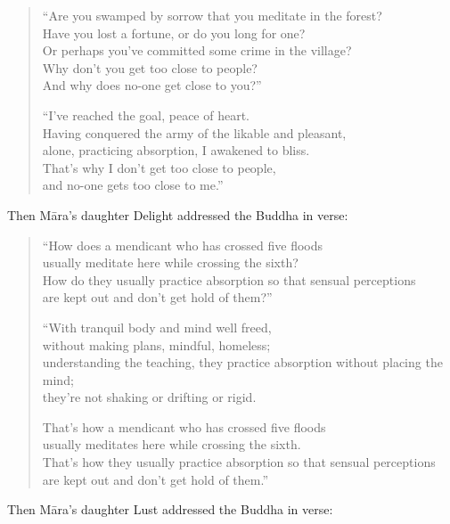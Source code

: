 \documentclass[12pt,openany]{book}%
\begin{document}
\begin{verse}%
“Are you swamped by sorrow that you meditate in the forest? \\
Have you lost a fortune, or do you long for one? \\
Or perhaps you’ve committed some crime in the village? \\
Why don’t you get too close to people? \\
And why does no-one get close to you?” 

“I’ve reached the goal, peace of heart. \\
Having conquered the army of the likable and pleasant, \\
alone, practicing absorption, I awakened to bliss. \\
That’s why I don’t get too close to people, \\
and no-one gets too close to me.” 

%
\end{verse}

Then \textsanskrit{Māra}’s daughter Delight addressed the Buddha in verse: 

\begin{verse}%
“How does a mendicant who has crossed five floods \\
usually meditate here while crossing the sixth? \\
How do they usually practice absorption so that sensual perceptions \\
are kept out and don’t get hold of them?” 

“With tranquil body and mind well freed, \\
without making plans, mindful, homeless; \\
understanding the teaching, they practice absorption without placing the mind; \\
they’re not shaking or drifting or rigid. 

That’s how a mendicant who has crossed five floods \\
usually meditates here while crossing the sixth. \\
That’s how they usually practice absorption so that sensual perceptions \\
are kept out and don’t get hold of them.” 

%
\end{verse}

Then \textsanskrit{Māra}’s daughter Lust addressed the Buddha in verse: 
\end{document}
